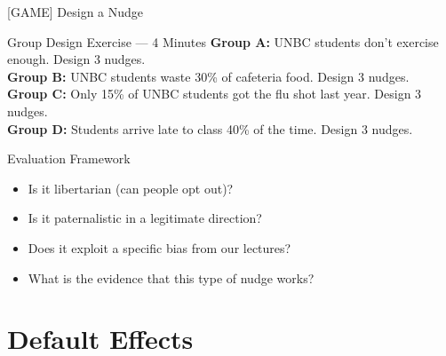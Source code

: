\documentclass[aspectratio=169]{beamer}
\begin{document}
\begin{frame}{[GAME] Design a Nudge}
\begin{alertblock}{Group Design Exercise --- 4 Minutes}
\textbf{Group A:} UNBC students don't exercise enough. Design 3 nudges.\\[0.3em]
\textbf{Group B:} UNBC students waste 30\% of cafeteria food. Design 3 nudges.\\[0.3em]
\textbf{Group C:} Only 15\% of UNBC students got the flu shot last year. Design 3 nudges.\\[0.3em]
\textbf{Group D:} Students arrive late to class 40\% of the time. Design 3 nudges.
\end{alertblock}
\begin{block}{Evaluation Framework}
\begin{itemize}
  \item Is it libertarian (can people opt out)?
  \item Is it paternalistic in a legitimate direction?
  \item Does it exploit a specific bias from our lectures?
  \item What is the evidence that this type of nudge works?
\end{itemize}
\end{block}
\end{frame}

\section{Default Effects}
\end{document}
